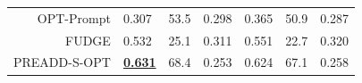 \begin{table}[h!]
\begin{tabular}{rllllll}
OPT-Prompt & {\color{airforceblue}0.307} & {\color{airforceblue}53.5} & {\color{airforceblue}0.298}	& {\color{airforceblue}0.365}	& {\color{airforceblue}50.9} & {\color{airforceblue}0.287} \\ %
FUDGE & {\color{airforceblue}0.532} & {\color{airforceblue}25.1} & {\color{airforceblue}0.311} & {\color{airforceblue}0.551} & {\color{airforceblue}22.7} & {\color{airforceblue}0.320} \\ %
PREADD-S-OPT & \underline{\textbf{{\color{airforceblue}0.631}}} & {\color{airforceblue}68.4} & {\color{airforceblue}0.253} & {\color{airforceblue}0.624} & {\color{airforceblue}67.1} & {\color{airforceblue}0.258} \\ %
\bottomrule
\end{tabular}
\label{tab:sent}
\end{table}

